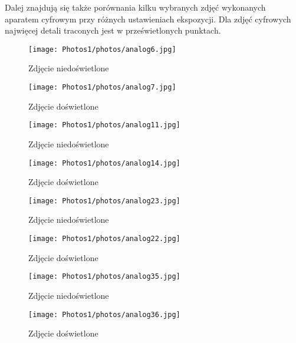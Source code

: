 \documentclass[]{mwart}
\begin{document}
Dalej znajdują się także porównania kilku wybranych zdjęć wykonanych
aparatem cyfrowym przy różnych ustawieniach ekspozycji. Dla zdjęć
cyfrowych najwięcej detali traconych jest w prześwietlonych punktach.











\begin{figure}[H]
    \centering
    \texttt{[image: Photos1/photos/analog6.jpg]}
    \caption{Zdjęcie niedoświetlone}
\end{figure}
\begin{figure}[H]
    \centering
    \texttt{[image: Photos1/photos/analog7.jpg]}
    \caption{Zdjęcie doświetlone}
\end{figure}



\begin{figure}[H]
    \centering
    \texttt{[image: Photos1/photos/analog11.jpg]}
    \caption{Zdjęcie niedoświetlone}
\end{figure}
\begin{figure}[H]
    \centering
    \texttt{[image: Photos1/photos/analog14.jpg]}
    \caption{Zdjęcie doświetlone}
\end{figure}



\begin{figure}[H]
    \centering
    \texttt{[image: Photos1/photos/analog23.jpg]}
    \caption{Zdjęcie niedoświetlone}
\end{figure}
\begin{figure}[H]
    \centering
    \texttt{[image: Photos1/photos/analog22.jpg]}
    \caption{Zdjęcie doświetlone}
\end{figure}


\begin{figure}[H]
    \centering
    \texttt{[image: Photos1/photos/analog35.jpg]}
    \caption{Zdjęcie niedoświetlone}
\end{figure}
\begin{figure}[H]
    \centering
    \texttt{[image: Photos1/photos/analog36.jpg]}
    \caption{Zdjęcie doświetlone}
\end{figure}
\end{document}
